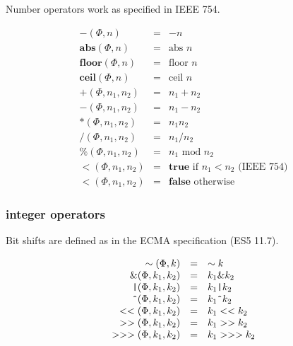 \documentclass[draft, 10pt]{article}
\newcommand{\num}[0]{n}
\newcommand{\intg}[0]{k}
\newcommand{\true}[0]{\textbf{true}}
\newcommand{\false}[0]{\textbf{false}}
\newcommand{\opabs}[0]{\textbf{abs}}
\newcommand{\opfloor}[0]{\textbf{floor}}
\newcommand{\opceil}[0]{\textbf{ceil}}
\newcommand{\opbnot}[0]{\sim}
\newcommand{\opneg}[0]{-}
\newcommand{\opband}[0]{\&}
\newcommand{\opbor}[0]{\texttt{|}}
\newcommand{\opbxor}[0]{\texttt{\^{}}}
\newcommand{\opshiftl}[0]{<<}
\newcommand{\opshiftr}[0]{>>}
\newcommand{\opzfshiftr}[0]{>>>}
\newcommand{\opadd}[0]{+}
\newcommand{\opsub}[0]{-}
\newcommand{\opmul}[0]{*}
\newcommand{\opdiv}[0]{/}
\newcommand{\opmod}[0]{\%}
\newcommand{\oplt}[0]{<}
\newcommand{\heap}[0]{\Phi}
\newcommand{\rununop}[3]{#1(#2,#3)}
\newcommand{\runbinop}[4]{#1(#2,#3,#4)}
\begin{document}
Number operators work as specified in IEEE 754.

\[
\begin{array}{rcl}
\rununop{\opneg}{\heap}{\num} &=& -\num \\
\rununop{\opabs}{\heap}{\num} &=& \textrm{abs } \num \\
\rununop{\opfloor}{\heap}{\num} &=& \textrm{floor } \num \\
\rununop{\opceil}{\heap}{\num} &=& \textrm{ceil } \num \\
\runbinop{\opadd}{\heap}{\num_1}{\num_2} &=& \num_1 + \num_2 \\
\runbinop{\opsub}{\heap}{\num_1}{\num_2} &=& \num_1 - \num_2 \\
\runbinop{\opmul}{\heap}{\num_1}{\num_2} &=& \num_1 \num_2 \\
\runbinop{\opdiv}{\heap}{\num_1}{\num_2} &=& \num_1 / \num_2 \\
\runbinop{\opmod}{\heap}{\num_1}{\num_2} &=& \num_1 \textrm{ mod } \num_2 \\
\runbinop{\oplt}{\heap}{\num_1}{\num_2} &=& \true \textrm{ if $\num_1 < \num_2$ (IEEE 754)} \\
\runbinop{\oplt}{\heap}{\num_1}{\num_2} &=& \false \textrm{ otherwise}
\end{array}
\]

\subsubsection{integer operators}

Bit shifts are defined as in the ECMA specification (ES5 11.7).

\[
\begin{array}{rcl}
\rununop{\opbnot}{\heap}{\intg} &=& \opbnot\intg \\
\runbinop{\opband}{\heap}{\intg_1}{\intg_2} &=& \intg_1 \opband \intg_2 \\
\runbinop{\opbor}{\heap}{\intg_1}{\intg_2} &=& \intg_1 \opbor \intg_2 \\
\runbinop{\opbxor}{\heap}{\intg_1}{\intg_2} &=& \intg_1 \opbxor \intg_2 \\
\runbinop{\opshiftl}{\heap}{\intg_1}{\intg_2} &=& \intg_1 \opshiftl \intg_2 \\
\runbinop{\opshiftr}{\heap}{\intg_1}{\intg_2} &=& \intg_1 \opshiftr \intg_2 \\
\runbinop{\opzfshiftr}{\heap}{\intg_1}{\intg_2} &=& \intg_1 \opzfshiftr \intg_2 
\end{array}
\]
\end{document}

